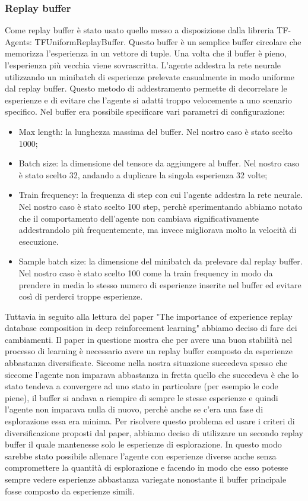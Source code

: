 \documentclass[conference]{IEEEtran}
\begin{document}
\subsubsection{Replay buffer}
Come replay buffer è stato usato quello messo a disposizione dalla libreria TF-Agents: TFUniformReplayBuffer. Questo buffer è un semplice buffer circolare che memorizza l'esperienza in un vettore di tuple. Una volta che il buffer è pieno, l'esperienza più vecchia viene sovrascritta. L'agente addestra la rete neurale utilizzando un minibatch di esperienze prelevate casualmente in modo uniforme dal replay buffer. Questo metodo di addestramento permette di decorrelare le esperienze e di evitare che l'agente si adatti troppo velocemente a uno scenario specifico. Nel buffer era possibile specificare vari parametri di configurazione:
\begin{itemize}
    \item Max length: la lunghezza massima del buffer. Nel nostro caso è stato scelto 1000;
    \item Batch size: la dimensione del tensore da aggiungere al buffer. Nel nostro caso è stato scelto 32, andando a duplicare la singola esperienza 32 volte;
    \item Train frequency: la frequenza di step con cui l'agente addestra la rete neurale. Nel nostro caso è stato scelto 100 step, perchè sperimentando abbiamo notato che il comportamento dell'agente non cambiava significativamente addestrandolo più frequentemente, ma invece migliorava molto la velocità di esecuzione.
    \item Sample batch size: la dimensione del minibatch da prelevare dal replay buffer. Nel nostro caso è stato scelto 100 come la train frequency in modo da prendere in media lo stesso numero di esperienze inserite nel buffer ed evitare così di perderci troppe esperienze.
\end{itemize}
Tuttavia in seguito alla lettura del paper "The importance of experience replay database composition in deep reinforcement learning"\cite{b1} abbiamo deciso di fare dei cambiamenti. Il paper in questione mostra che per avere una buon stabilità nel processo di learning è necessario avere un replay buffer composto da esperienze abbastanza diversificate. Siccome nella nostra situazione succedeva spesso che siccome l'agente non imparava abbastanza in fretta quello che succedeva è che lo stato tendeva a convergere ad uno stato in particolare (per esempio le code piene), il buffer si andava a riempire di sempre le stesse esperienze e quindi l'agente non imparava nulla di nuovo, perchè anche se c'era una fase di esplorazione essa era minima. Per risolvere questo problema ed usare i criteri di diversificazione proposti dal paper, abbiamo deciso di utilizzare un secondo replay buffer il quale mantenesse solo le esperienze di esplorazione. In questo modo sarebbe stato possibile allenare l'agente con esperienze diverse anche senza compromettere la quantità di esplorazione e facendo in modo che esso potesse sempre vedere esperienze abbastanza variegate nonostante il buffer principale fosse composto da esperienze simili.
\end{document}
